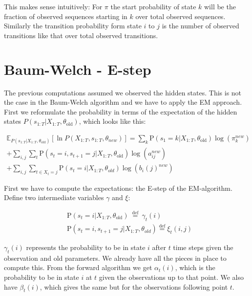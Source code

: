 This makes sense intuitively: For $\pi$ the start probability of state $k$ will be the fraction of observed sequences starting in $k$ over total observed sequences. Similarly the transition probability form state $i$ to $j$ is the number of observed transitions like that over total observed transitions. 

\section{Baum-Welch - E-step}

The previous computations assumed we observed the hidden states. This is not the case in the Baum-Welch algorithm and we have to apply the EM approach. First we  reformulate the probability in terms of the expectation of the hidden states $P\left(s_{1: T} | X_{1: T}, \theta_{\text {old}}\right)$, which looks like this:

\begin{equation}
\begin{split}
\mathbb{E}_{P\left(s_{1: T} | X_{1: T}, 
\theta_{\text {old}}\right)}\left[\ln P\left(X_{1: T}, s_{1: T}, \theta_{n e w}\right)\right] 
=\sum_{k} \mathrm{P}\left(s_{1}=k | X_{1: T}, \theta_{\text {old}}\right) \log \left(\pi_{k}^{n e w}\right) \\
+\sum_{i, j} \sum_{t} \mathrm{P}\left(s_{t}=i, s_{t+1}=j | X_{1: T}, \theta_{\text {old}}\right) \log \left(a_{i j}^{n e w}\right) \\
+\sum_{i, j} \sum_{t \in X_t = j} \mathrm{P}\left(s_{t}=i | X_{1: T}, \theta_{o l d}\right)    \log \left(b_{i}(j)^{n e w}\right)
\end{split}
\end{equation}

First we have to compute the expectations: the E-step of the EM-algorithm. Define two intermediate variables $\gamma$ and $\xi$: 

\begin{equation}
  \begin{aligned}
&\mathrm{P}\left(s_{t}=i | X_{1: T}, \theta_{\text {old}}\right) \stackrel{\text { def }}{=} \gamma_{t}(i)\\
&\mathrm{P}\left(s_{t}=i, s_{t+1}=j | X_{1: T}, \theta_{o l d}\right) \stackrel{\mathrm{def}}{=} \xi_{t}(i, j)
\end{aligned} 
\end{equation}

$\gamma_t(i)$ represents the probability to be in state $i$ after $t$ time steps given the observation and old parameters. We already have all the pieces in place to compute this. From the forward algorithm we get $\alpha_t(i)$, which is the probability to be in state $i$ at $t$ given the observations up to that point. We also have $\beta_t(i)$, which gives the same but for the observations following point $t$.

